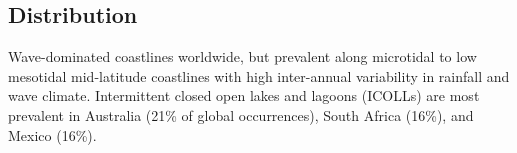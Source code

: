 \documentclass[
  letterpaper,
  DIV=11,
  numbers=noendperiod]{scrartcl}
\begin{document}
\subsection{Distribution}\label{distribution-133}

Wave-dominated coastlines worldwide, but prevalent along microtidal to
low mesotidal mid-latitude coastlines with high inter-annual variability
in rainfall and wave climate. Intermittent closed open lakes and lagoons
(ICOLLs) are most prevalent in Australia (21\% of global occurrences),
South Africa (16\%), and Mexico (16\%).
\end{document}
